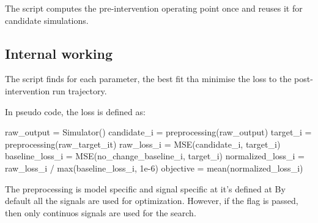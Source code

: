 \documentclass[11pt]{article}
\begin{document}
The script computes the pre-intervention operating point once and reuses it for candidate simulations.

\subsection{Internal working}
The script finds for each parameter, the best fit tha minimise the loss to the post-intervention run trajectory.

In pseudo code, the loss is defined as:
\begin{DocCode}
raw_output = Simulator()
candidate_i = preprocessing(raw_output)
target_i = preprocessing(raw_target_it)
raw_loss_i = MSE(candidate_i, target_i)
baseline_loss_i = MSE(no_change_baseline_i, target_i)
normalized_loss_i = raw_loss_i / max(baseline_loss_i, 1e-6)
objective = mean(normalized_loss_i)
\end{DocCode}
The preprocessing is model specific and signal specific at it's defined at  
By default all the signals are used for optimization. However, if the flag  is passed, then only continuos signals are used for the search.  
\end{document}
